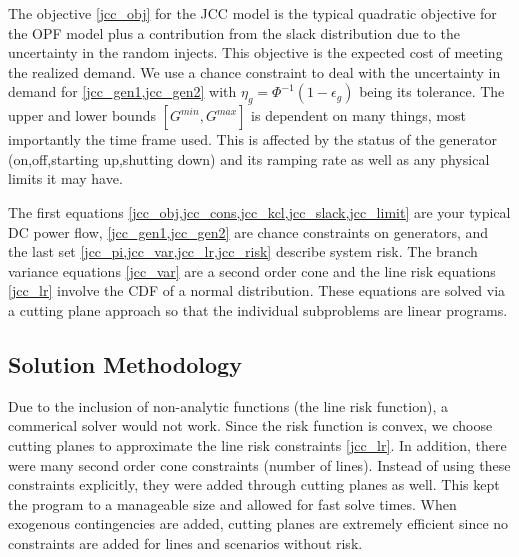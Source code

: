 The objective \ref{jcc_obj} for the JCC model is the typical quadratic objective for the OPF model plus a contribution from the slack distribution due to the uncertainty in the random injects.  This objective is the expected cost of meeting the realized demand.  We use a chance constraint to deal with the uncertainty in demand for \cref{jcc_gen1,jcc_gen2} with $\eta_g = \Phi^{-1}(1-\epsilon_g)$ being its tolerance.  The upper and lower bounds $[G^{min},G^{max}]$ is dependent on many things, most importantly the time frame used.  This is affected by the status of the generator (on,off,starting up,shutting down) and its ramping rate as well as any physical limits it may have.  

The first equations \cref{jcc_obj,jcc_cons,jcc_kcl,jcc_slack,jcc_limit} are your typical DC power flow, \cref{jcc_gen1,jcc_gen2} are chance constraints on generators, and the last set \cref{jcc_pi,jcc_var,jcc_lr,jcc_risk} describe system risk.  The branch variance equations \ref{jcc_var} are a second order cone and the line risk equations \ref{jcc_lr} involve the CDF of a normal distribution.  These equations are solved via a cutting plane approach so that the individual subproblems are linear programs.


\subsection{Solution Methodology}\label{solutionmethodology}
Due to the inclusion of non-analytic functions (the line risk function), a commerical solver would not work.  Since the risk function is convex, we choose cutting planes to approximate the line risk constraints \ref{jcc_lr}.  In addition, there were many second order cone constraints (number of lines).  Instead of using these constraints explicitly, they were added through cutting planes as well.  This kept the program to a manageable size and allowed for fast solve times.  When exogenous contingencies are added, cutting planes are extremely efficient since no constraints are added for lines and scenarios without risk.

